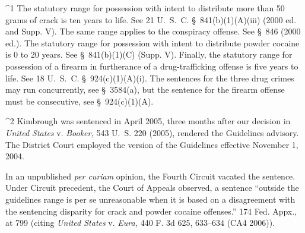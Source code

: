 ^1 The statutory range for possession with intent to distribute more
than 50 grams of crack is ten years to life. See 21 U.~S.~C.
\S~841(b)(1)(A)(iii) (2000 ed. and Supp. V). The same range applies
to the conspiracy offense. See \S~846 (2000 ed.). The statutory
range for possession with intent to distribute powder cocaine is 0 to 20
years. See \S~841(b)(1)(C) (Supp. V). Finally, the statutory range
for possession of a firearm in furtherance of a drug-trafficking offense
is five years to life. See 18 U.~S.~C. \S~924(c)(1)(A)(i).
The sentences for the three drug crimes may run concurrently, see
\S~3584(a), but the sentence for the firearm offense must be
consecutive, see \S~924(c)(1)(A).

^2 Kimbrough was sentenced in April 2005, three months after our
decision in \emph{United States} v. \emph{Booker,} 543 U.~S. 220 (2005),
rendered the Guidelines advisory. The District Court employed the
version of the Guidelines effective November 1, 2004.

  In an unpublished \emph{per curiam} opinion, the Fourth Circuit vacated
the sentence. Under Circuit precedent, the Court of Appeals observed, a
sentence ``outside the guidelines range is per se unreasonable when it
is based on a disagreement with the sentencing disparity for crack and
powder cocaine offenses.'' 174 Fed. Appx., at 799 (citing \emph{United
States} v. \emph{Eura,} 440 F. 3d 625, 633--634 (CA4 2006)).


